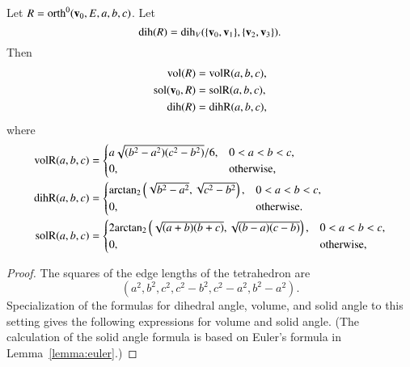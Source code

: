 \begin{lemma}[]\label{lemma:orth:abc} 
Let $R={\operatorname{orth}}^0({\mathbf v}_0,E,a,b,c)$.  Let 
\[ 
{\operatorname{dih}}(R) = \operatorname{dih}_V(\{{\mathbf v}_0,{\mathbf v}_1\},\{{\mathbf v}_2,{\mathbf v}_3\}).
\]  
Then
\begin{align*}
{\operatorname{vol}}(R) &= {\operatorname{volR}}(a,b,c),\\
\operatorname{sol}({\mathbf v}_0,R) &= {\operatorname{solR}}(a,b,c),\\
{\operatorname{dih}}(R) &= {\operatorname{dihR}}(a,b,c),\\
\end{align*}
where
\begin{align*}
\op{volR}(a,b,c) &= \begin{cases}
a\sqrt{(b^2-a^2)(c^2-b^2)}/6,& 0 < a < b < c,\\
0,&\text{otherwise,}
\end{cases}\vspace{6pt}\\
\op{dihR}(a,b,c) &= \begin{cases}
\atn\left(\sqrt{b^2 - a^2},\sqrt{c^2 - b^2}\right),
& 0 < a < b < c,\\
0,&\text{otherwise.}
\end{cases} \vspace{6pt}\\
\op{solR}(a,b,c)&= \begin{cases}
2 \atn\left(\sqrt{{(a+b)(b+c)}},
\sqrt{{(b-a) (c-b)}}\right),& 0 < a < b < c,\\
0,&\text{otherwise,}
\end{cases}
\end{align*}
%
%
%
\end{lemma}

\begin{proof}
The squares of the edge lengths of the tetrahedron are
\[ 
(a^2,b^2,c^2,c^2-b^2,c^2-a^2,b^2-a^2).
\] 
Specialization of the formulas for dihedral angle, volume, and solid
angle to this setting gives the following expressions for volume and solid
angle.  (The calculation of the solid angle formula is based on
Euler's formula in Lemma~\ref{lemma:euler}.)
\end{proof}

